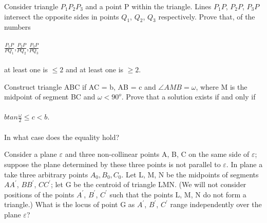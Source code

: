 \item Consider triangle $P_1P_2P_3$ and a point P within the triangle. Lines $P_1P$, $P_2P$, $P_3P$ intersect the opposite sides in points $Q_1$, $Q_2$, $Q_3$ respectively. Prove that, of the numbers\\
\\ $\frac{P_1P}{PQ_1}$,$\frac{P_2P}{PQ_2}$,$\frac{P_3P}{PQ_3}$\\
\\ at least one is $\leq 2$ and at least one is $\geq 2$.\\

\item Construct triangle ABC if AC = b, AB = c and $\angle AMB = \omega $, where M is the midpoint of segment BC and $\omega < 90^o$. Prove that a solution exists if and only if\\
\\ $btan\frac{\omega}{2}\leq c < b$.\\
\\ In what case does the equality hold?\\

\item Consider a plane $\varepsilon$ and three non-collinear points A, B, C on the same side of $\varepsilon$; suppose the plane determined by these three points is not parallel to $\varepsilon$. In plane a take three arbitrary points $A_0, B_0, C_0$. Let L, M, N be the midpoints of segments $AA^{'}$, $BB^{'}$, $CC^{'}$; let G be the centroid of triangle LMN. (We will not consider positions of the points $A^{'}$, $B^{'}$, $C^{'}$ such that the points L, M, N do not form a triangle.) What is the locus of point G as $A^{'}$, $B^{'}$, $C^{'}$ range independently over the plane $\varepsilon$?

